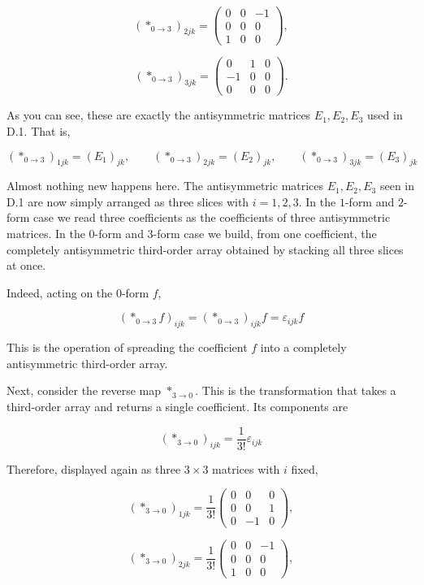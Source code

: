 \[
(\ast_{0\to3})_{2jk}
=
\begin{pmatrix}
0&0&-1\\
0&0&0\\
1&0&0
\end{pmatrix},
\]

\[
(\ast_{0\to3})_{3jk}
=
\begin{pmatrix}
0&1&0\\
-1&0&0\\
0&0&0
\end{pmatrix}.
\]

As you can see, these are exactly the antisymmetric matrices
\(E_1,E_2,E_3\) used in D.1. That is,

\[
(\ast_{0\to3})_{1jk}= (E_1)_{jk},
\qquad
(\ast_{0\to3})_{2jk}= (E_2)_{jk},
\qquad
(\ast_{0\to3})_{3jk}= (E_3)_{jk}
\]

Almost nothing new happens here. The antisymmetric matrices
\(E_1,E_2,E_3\) seen in D.1 are now simply arranged as three slices with
\(i=1,2,3\). In the \(1\)-form and \(2\)-form case we read three
coefficients as the coefficients of three antisymmetric matrices. In the
\(0\)-form and \(3\)-form case we build, from one coefficient, the
completely antisymmetric third-order array obtained by stacking all
three slices at once.

Indeed, acting on the \(0\)-form \(f\),

\[
(\ast_{0\to3}f)_{ijk}
=
(\ast_{0\to3})_{ijk}f
=
\varepsilon_{ijk}f
\]

This is the operation of spreading the coefficient \(f\) into a
completely antisymmetric third-order array.

Next, consider the reverse map \(\ast_{3\to0}\). This is the
transformation that takes a third-order array and returns a single
coefficient. Its components are

\[
(\ast_{3\to0})_{ijk}
=
\frac{1}{3!}\varepsilon_{ijk}
\]

Therefore, displayed again as three \(3\times3\) matrices with \(i\)
fixed,

\[
(\ast_{3\to0})_{1jk}
=
\frac{1}{3!}
\begin{pmatrix}
0&0&0\\
0&0&1\\
0&-1&0
\end{pmatrix},
\]

\[
(\ast_{3\to0})_{2jk}
=
\frac{1}{3!}
\begin{pmatrix}
0&0&-1\\
0&0&0\\
1&0&0
\end{pmatrix},
\]

